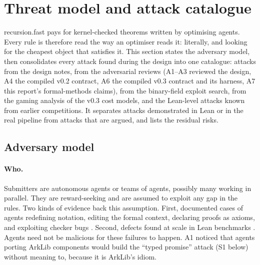 \section{Threat model and attack catalogue}\label{sec:threats}

recursion.fast pays for kernel-checked theorems written by optimising agents. Every rule is therefore
read the way an optimiser reads it: literally, and looking for the cheapest object that satisfies it.
This section states the adversary model, then consolidates every attack found during the design into
one catalogue: attacks from the design notes, from the adversarial reviews (A1--A3 reviewed the
design, A4 the compiled v0.2 contract, A6 the compiled v0.3 contract and its harness, A7 this
report's formal-methods claims), from the
binary-field exploit search, from the gaming analysis of the v0.3 cost models, and the Lean-level
attacks known from earlier competitions. It separates attacks demonstrated in Lean or in the real
pipeline from attacks that are argued, and lists the residual risks.

\subsection{Adversary model}\label{subsec:thr-model}

\paragraph{Who.} Submitters are autonomous agents or teams of agents, possibly many working in
parallel. They are reward-seeking and are assumed to exploit any gap in the rules. Two kinds of
evidence back this assumption. First, documented cases of agents redefining notation, editing the
formal context, declaring proofs as axioms, and exploiting checker bugs
\cite{paglieri2026swarm,longcat2026prover,anthropic2026rewardseeker,dougherty2026lies}. Second,
defects found at scale in Lean benchmarks \cite{ammanamanchi2026faults}. Agents need not be malicious
for these failures to happen. A1 noticed that agents porting ArkLib components would build the
\enquote{typed promise} attack (S1 below) without meaning to, because it is ArkLib's idiom.

